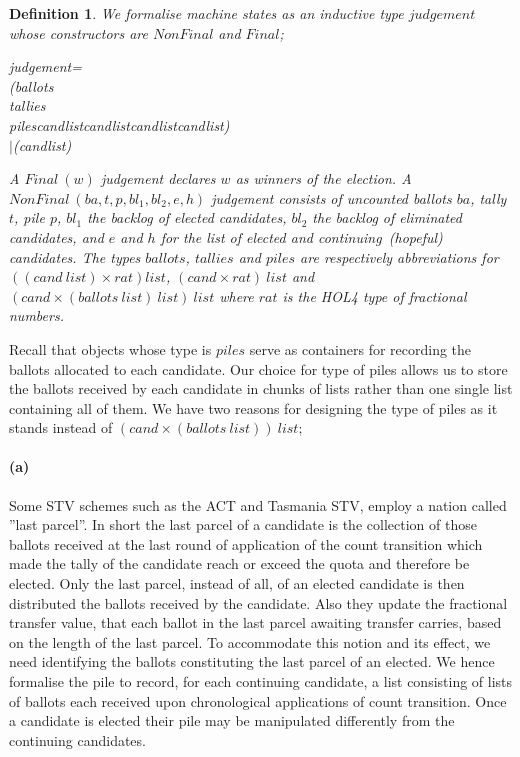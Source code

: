 \documentclass[10pt,conference]{IEEEtran}
\renewcommand{\HOLConst}[1]{{\textsf{\upshape #1}}}
\renewcommand{\HOLTyOp}[1]{\textsf{\itshape #1}}
\renewcommand{\HOLTokenBar}{\ensuremath{\mathtt{|}}}
\newtheorem{definition}{Definition}
\begin{document}
\begin{definition}\label{judgement}
We formalise machine states as an inductive type  $\mathit{judgement}$ whose constructors are  $\mathit{NonFinal}$ and $\mathit{Final}$; 
\begin{holthmenv}
\HOLTyOp{judgement}\;=\\
\;\;\;\;\HOLConst{NonFinal}\;(\HOLTyOp{ballots}\;\HOLTokenProd{}\\
\;\;\;\;\;\HOLTyOp{tallies}\;\HOLTokenProd{}\\
\;\;\;\;\;\HOLTyOp{piles}\;\HOLTokenProd{}\;\HOLTyOp{cand}\;\HOLTyOp{list}\;\HOLTokenProd{}\;\HOLTyOp{cand}\;\HOLTyOp{list}\;\HOLTokenProd{}\;\HOLTyOp{cand}\;\HOLTyOp{list}\;\HOLTokenProd{}\;\HOLTyOp{cand}\;\HOLTyOp{list})\\
\;\;\HOLTokenBar{}\;\HOLConst{Final}\;(\HOLTyOp{cand}\;\HOLTyOp{list})
\end{holthmenv}

 A $\mathit{Final~(w)}$ judgement declares $w$ as winners of the election. A  $\mathit{NonFinal~(ba,t,p,bl_{1},bl_{2},e,h)}$ judgement  consists of uncounted ballots $ba$, tally $t$, pile $p$, $bl_{1}$ the backlog of elected candidates, $bl_{2}$ the backlog of eliminated candidates, and $e$ and $h$ for the list of elected and continuing~(hopeful) candidates. The types  $\mathit{ballots}$, $\mathit{tallies}$ and $\mathit{piles}$ are respectively abbreviations for  $\mathit{((cand ~list)\times rat) list}$,   $\mathit{(cand\times rat)~list}$ and $\mathit{(cand\times(ballots~list)~list) ~list}$ where $\mathit{rat}$ is the HOL4 type of fractional numbers.
\end{definition}
 Recall that objects whose type is $\mathit{piles}$ serve as containers for recording the ballots allocated to each candidate. Our choice for type of piles allows us to store the ballots received by each candidate in chunks of lists rather than one single list containing all of them.  We have two reasons for designing the type of piles as it stands instead of $\mathit{(cand\times(ballots~list))~list}$;  
\paragraph*{(a)} Some STV schemes such as  the ACT and Tasmania STV, employ a nation called ''last parcel''. In short the last parcel of a candidate is the collection of those ballots received at the last round of application of the count transition which made the tally of the candidate reach or exceed the quota and therefore be elected.  Only the last parcel, instead of all, of an elected candidate is then distributed the ballots received by the candidate. Also  they update the fractional transfer value, that each ballot in the last parcel  awaiting transfer carries, based on the length of the last parcel. To  accommodate this notion and its effect, we need identifying the ballots constituting the last parcel of an elected. We hence formalise the pile to record, for each  continuing candidate, a list consisting of lists of ballots each received upon  chronological applications of count transition.  Once a candidate is elected their pile may be manipulated differently from the continuing candidates. 
\end{document}
